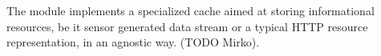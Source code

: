 The \href{https://github.com/koanlogic/webthings/bits/kache}{} module implements a specialized cache aimed at storing informational resources, be it sensor generated data stream or a typical HTTP resource representation, in an agnostic way. (TODO Mirko).
